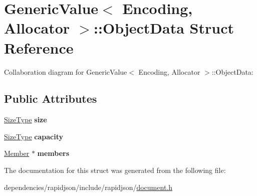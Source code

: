 \hypertarget{struct_generic_value_1_1_object_data}{}\section{Generic\+Value$<$ Encoding, Allocator $>$\+:\+:Object\+Data Struct Reference}
\label{struct_generic_value_1_1_object_data}


Collaboration diagram for Generic\+Value$<$ Encoding, Allocator $>$\+:\+:Object\+Data\+:
\subsection*{Public Attributes}
\begin{DoxyCompactItemize}
\item 
\mbox{\label{struct_generic_value_1_1_object_data_a8aa09c430b245b9bb0745a1ab38201d5}} 
\hyperlink{rapidjson_8h_a5ed6e6e67250fadbd041127e6386dcb5}{Size\+Type} {\bfseries size}
\item 
\mbox{\label{struct_generic_value_1_1_object_data_a22b8d8b01d52db71471f0d4c990cb93b}} 
\hyperlink{rapidjson_8h_a5ed6e6e67250fadbd041127e6386dcb5}{Size\+Type} {\bfseries capacity}
\item 
\mbox{\label{struct_generic_value_1_1_object_data_a108be865f16e4c028f2354b1474a1ec8}} 
\hyperlink{class_generic_value_a7ccf27c44058b4c11c3efc6473afb886}{Member} $\ast$ {\bfseries members}
\end{DoxyCompactItemize}


The documentation for this struct was generated from the following file\+:\begin{DoxyCompactItemize}
\item 
dependencies/rapidjson/include/rapidjson/\hyperlink{document_8h}{document.\+h}\end{DoxyCompactItemize}
